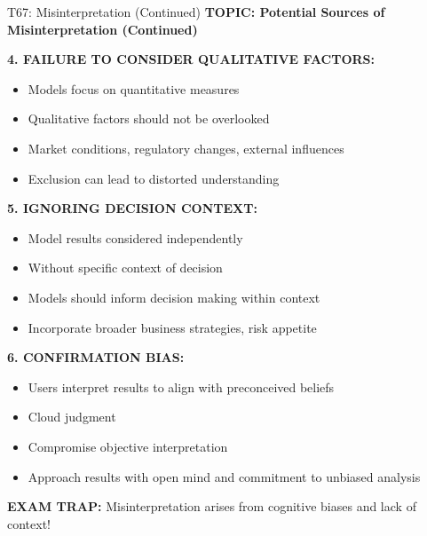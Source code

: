 \documentclass[8pt]{beamer}
\begin{document}
	\begin{frame}{T67: Misinterpretation (Continued)}
		\fontsize{6.5}{7.5}\selectfont
		\textbf{TOPIC: Potential Sources of Misinterpretation (Continued)}
		
		\vspace{0.1cm}
		\textbf{4. FAILURE TO CONSIDER QUALITATIVE FACTORS:}
		\begin{itemize}
			\item Models focus on quantitative measures
			\item Qualitative factors should not be overlooked
			\item Market conditions, regulatory changes, external influences
			\item Exclusion can lead to distorted understanding
		\end{itemize}
		
		\vspace{0.1cm}
		\textbf{5. IGNORING DECISION CONTEXT:}
		\begin{itemize}
			\item Model results considered independently
			\item Without specific context of decision
			\item Models should inform decision making within context
			\item Incorporate broader business strategies, risk appetite
		\end{itemize}
		
		\vspace{0.1cm}
		\textbf{6. CONFIRMATION BIAS:}
		\begin{itemize}
			\item Users interpret results to align with preconceived beliefs
			\item Cloud judgment
			\item Compromise objective interpretation
			\item Approach results with open mind and commitment to unbiased analysis
		\end{itemize}
		
		\textcolor{myred}{\textbf{EXAM TRAP:}} Misinterpretation arises from \textcolor{myblue}{cognitive biases and lack of context}!
	\end{frame}
	
\end{document}
